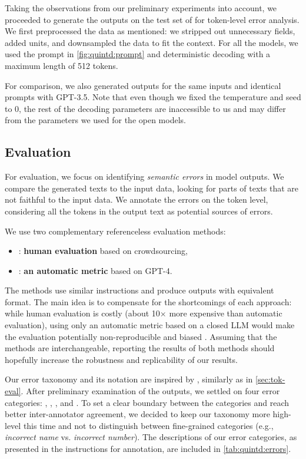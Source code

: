 Taking the observations from our preliminary experiments into account, we proceeded to generate the outputs on the test set of \benchmark{} for token-level error analysis. We first preprocessed the data as mentioned: we stripped out unnecessary fields, added units, and downsampled the data to fit the context. For all the models, we used the prompt in \autoref{fig:quintd:prompt} and deterministic decoding with a maximum length of 512 tokens.

For comparison, we also generated outputs for the same inputs and identical prompts with GPT-3.5. Note that even though we fixed the temperature and seed to $0$, the rest of the decoding parameters are inaccessible to us and may differ from the parameters we used for the open models.


\subsection{Evaluation}
\label{sec:quintd:eval}
For evaluation, we focus on identifying \emph{semantic errors} in model outputs. We compare the generated texts to the input data, looking for parts of texts that are not faithful to the input data. We annotate the errors on the token level, considering all the tokens in the output text as potential sources of errors.


We use two complementary referenceless evaluation methods:
\begin{itemize}
    \item \humanmetric{}: \textbf{human evaluation} based on crowdsourcing,
    \item \gptmetric{}: \textbf{an automatic metric} based on GPT-4.
\end{itemize}

The methods use similar instructions and produce outputs with equivalent format. The main idea is to compensate for the shortcomings of each approach: while human evaluation is costly (about 10$\times$ more expensive than automatic evaluation), using only an automatic metric based on a closed LLM would make the evaluation potentially non-reproducible and biased \cite{kocmiGEMBAMQMDetectingTranslation2023,wangLargeLanguageModels2023}. Assuming that the methods are interchangeable, reporting the results of both methods should hopefully increase the robustness and replicability of our results.




Our error taxonomy and its notation are inspired by \citet{thomsonGoldStandardMethodology2020}, similarly as in \autoref{sec:tok-eval}. After preliminary examination of the outputs, we settled on four error categories: , , , and . To set a clear boundary between the categories and reach better inter-annotator agreement, we decided to keep our taxonomy more high-level this time and not to distinguish between fine-grained categories (e.g., \textit{incorrect name} vs. \textit{incorrect number}). The descriptions of our error categories, as presented in the instructions for annotation, are included in \autoref{tab:quintd:errors}.

